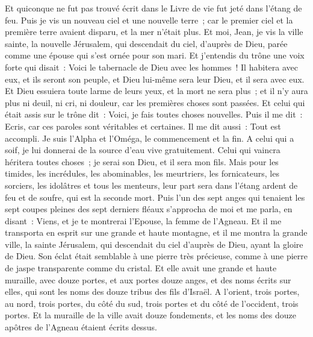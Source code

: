 \begin{multicols}{2}
Et quiconque ne fut pas trouvé écrit dans le Livre de vie fut jeté dans l'étang de feu.
\VerseOne{}Puis je vis un nouveau ciel et une nouvelle terre~; car le premier ciel et la première terre avaient disparu, et la mer n'était plus.
Et moi, Jean, je vis la ville sainte, la nouvelle Jérusalem, qui descendait du ciel, d'auprès de Dieu, parée comme une épouse qui s'est ornée pour son mari.
Et j'entendis du trône une voix forte qui disait~: Voici le tabernacle de Dieu avec les hommes~! Il habitera avec eux, et ils seront son peuple, et Dieu lui-même sera leur Dieu, et il sera avec eux.
Et Dieu essuiera toute larme de leurs yeux, et la mort ne sera plus~; et il n'y aura plus ni deuil, ni cri, ni douleur, car les premières choses sont passées.
Et celui qui était assis sur le trône dit~: Voici, je fais toutes choses nouvelles. Puis il me dit~: Ecris, car ces paroles sont véritables et certaines.
Il me dit aussi~: Tout est accompli. Je suis l'Alpha et l'Oméga, le commencement et la fin. A celui qui a soif, je lui donnerai de la source d'eau vive gratuitement.
Celui qui vaincra héritera toutes choses~; je serai son Dieu, et il sera mon fils.
Mais pour les timides, les incrédules, les abominables, les meurtriers, les fornicateurs, les sorciers, les idolâtres et tous les menteurs, leur part sera dans l'étang ardent de feu et de soufre, qui est la seconde mort.
Puis l'un des sept anges qui tenaient les sept coupes pleines des sept derniers fléaux s'approcha de moi et me parla, en disant~: Viens, et je te montrerai l'Epouse, la femme de l'Agneau.
Et il me transporta en esprit sur une grande et haute montagne, et il me montra la grande ville, la sainte Jérusalem, qui descendait du ciel d'auprès de Dieu,
ayant la gloire de Dieu. Son éclat était semblable à une pierre très précieuse, comme à une pierre de jaspe transparente comme du cristal.
Et elle avait une grande et haute muraille, avec douze portes, et aux portes douze anges, et des noms écrits sur elles, qui sont les noms des douze tribus des fils d'Israël.
A l'orient, trois portes, au nord, trois portes, du côté du sud, trois portes et du côté de l'occident, trois portes.
Et la muraille de la ville avait douze fondements, et les noms des douze apôtres de l'Agneau étaient écrits dessus.

\end{multicols}
